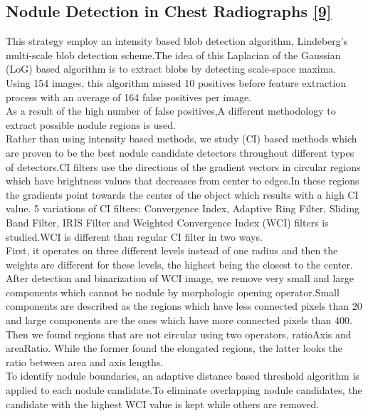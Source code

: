 \documentclass[hidelinks,12pt]{article}
\begin{document}
\newpage

\subsection{Nodule Detection in Chest Radiographs \hyperref[9]{[9]}}
This strategy employ an intensity based blob detection algorithm, Lindeberg’s multi-scale blob detection scheme.The idea of this Laplacian of the Gaussian (LoG) based algorithm is to extract blobs by detecting scale-space maxima.\\ Using 154 images, this algorithm missed 10 positives before feature extraction process with an average of 164 false positives per image.\\
As a result of the high number of false positives,A different methodology to extract possible nodule regions is used.\\ 
Rather than using intensity based methods, we study (CI) based methods which are proven to be the best nodule candidate detectors throughout different types of detectors.CI filters use the directions of the gradient vectors in circular regions which have brightness values that decreases from center to edges.In these regions the gradients point towards the center of the object which results with a high CI value. 5 variations of CI filters: Convergence Index, Adaptive Ring Filter, Sliding Band Filter, IRIS Filter and Weighted Convergence Index (WCI) filters is studied.WCI is different than regular CI filter in two ways.\\

 First, it operates on three different levels instead of one radius and then the weights are different for these levels, the highest being the closest to the center.\\
 
 After detection and binarization of WCI image, we remove very small and large components which cannot be nodule by morphologic opening operator.Small components are described as the regions which have less connected pixels than 20 and large components are the ones which have more connected pixels than 400.\\
 
 Then we found regions that are not circular using two operators, ratioAxis and areaRatio. While the former found the elongated regions, the latter looks the ratio between area and axis lengths.\\
To identify nodule boundaries, an adaptive distance based threshold algorithm is applied to each nodule candidate.To eliminate overlapping nodule candidates, the candidate with the highest WCI value is kept while others are removed.\\
\end{document}
